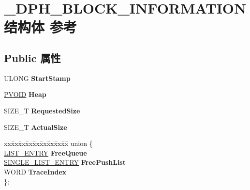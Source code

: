 \hypertarget{struct___d_p_h___b_l_o_c_k___i_n_f_o_r_m_a_t_i_o_n}{}\section{\+\_\+\+D\+P\+H\+\_\+\+B\+L\+O\+C\+K\+\_\+\+I\+N\+F\+O\+R\+M\+A\+T\+I\+O\+N结构体 参考}
\label{struct___d_p_h___b_l_o_c_k___i_n_f_o_r_m_a_t_i_o_n}
\subsection*{Public 属性}
\begin{DoxyCompactItemize}
\item 
\mbox{\label{struct___d_p_h___b_l_o_c_k___i_n_f_o_r_m_a_t_i_o_n_a7a031208445614d2b9e5792d94de4c54}} 
U\+L\+O\+NG {\bfseries Start\+Stamp}
\item 
\mbox{\label{struct___d_p_h___b_l_o_c_k___i_n_f_o_r_m_a_t_i_o_n_a8c5891bda1a2b6167b3cdffc14ffb911}} 
\hyperlink{interfacevoid}{P\+V\+O\+ID} {\bfseries Heap}
\item 
\mbox{\label{struct___d_p_h___b_l_o_c_k___i_n_f_o_r_m_a_t_i_o_n_a8f54dbc1f0ef4ac45a8dd7ed3fc0f226}} 
S\+I\+Z\+E\+\_\+T {\bfseries Requested\+Size}
\item 
\mbox{\label{struct___d_p_h___b_l_o_c_k___i_n_f_o_r_m_a_t_i_o_n_ac582f9f301d836d765eed8c9ef3d5331}} 
S\+I\+Z\+E\+\_\+T {\bfseries Actual\+Size}
\item 
\mbox{\label{struct___d_p_h___b_l_o_c_k___i_n_f_o_r_m_a_t_i_o_n_aa29b1c308cd6fa59529abafa39a78271}} 
\begin{tabbing}
xx\=xx\=xx\=xx\=xx\=xx\=xx\=xx\=xx\=\kill
union \{\\
\>\hyperlink{struct___l_i_s_t___e_n_t_r_y}{LIST\_ENTRY} {\bfseries FreeQueue}\\
\>\hyperlink{struct___s_i_n_g_l_e___l_i_s_t___e_n_t_r_y}{SINGLE\_LIST\_ENTRY} {\bfseries FreePushList}\\
\>WORD {\bfseries TraceIndex}\\
\}; \\


\end{tabbing}
\end{DoxyCompactItemize}
